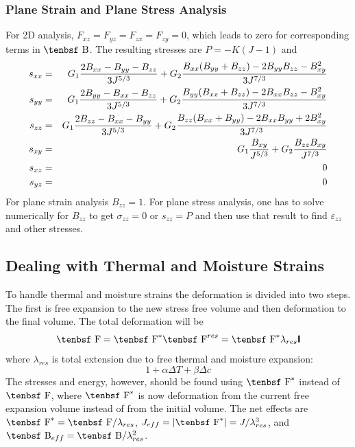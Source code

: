 \documentclass[11pt]{article}
\newcommand{\tens}[1]{\boldsymbol{\mathsf{#1}}}
\def\B{\hbox{\tenbsf B}}
\def\e#1{\varepsilon_{#1}}
\def\F{\hbox{\tenbsf F}}
\def\s#1{\sigma_{#1}}
\begin{document}
\subsubsection{Plane Strain and Plane Stress Analysis}

For 2D analysis, $F_{xz}=F_{yz}=F_{zx}=F_{zy}=0$, which leads to zero for corresponding terms in $\B$. The resulting stresses are $ P = -K (J-1)$ and
\begin{eqnarray}
      s_{xx} & = &  G_1{2B_{xx}-B_{yy}-B_{zz}\over 3J^{5/3}}  
                    + G_2{B_{xx}(B_{yy}+B_{zz})-2B_{yy}B_{zz}-B_{xy}^2\over 3J^{7/3} }\\
      s_{yy} & = &  G_1{2B_{yy}-B_{xx}-B_{zz}\over 3J^{5/3}}   
                     + G_2{B_{yy}(B_{xx}+B_{zz})-2B_{xx}B_{zz}-B_{xy}^2\over 3J^{7/3} }\\
      s_{zz} & = &   G_1{2B_{zz}-B_{xx}-B_{yy}\over 3J^{5/3}}   
                     + G_2{B_{zz}(B_{xx}+B_{yy})-2B_{xx}B_{yy}+2B_{xy}^2\over 3J^{7/3} }\\
       s_{xy} & = &  G_1{B_{xy}\over J^{5/3}} + G_2{B_{zz}B_{xy}\over J^{7/3}}\\
       s_{xz} & = & 0 \\
       s_{yz} & = & 0
\end{eqnarray}
For plane strain analysis $B_{zz}=1$. For plane stress analysis, one has to solve numerically for $B_{zz}$ to get $\s{zz}=0$ or $s_{zz}=P$ and then use that result to find $\e{zz}$ and other stresses.

\subsection{Dealing with Thermal and Moisture Strains}

To handle thermal and moisture strains the deformation is divided into two steps. The first is free expansion to the new stress free volume and then deformation to the final volume. The total deformation will be
\begin{equation}
      \F = \F^* \F^{res} = \F^* \lambda_{res}\tens I
\end{equation}
where $\lambda_{res}$ is total extension due to free thermal and moisture expansion:
\begin{equation}
    1 + \alpha\Delta T + \beta \Delta c
\end{equation}
The stresses and energy, however, should be found using $\F^*$ instead of $\F$, where $\F^*$ is now deformation from the current free expansion volume instead of from the initial volume. The net effects are $\F^* = \F/\lambda_{res}$, $J_{eff} = |\F^*| = J/\lambda_{res}^3$, and $\B_{eff} = \B/\lambda_{res}^2$.
\end{document}
